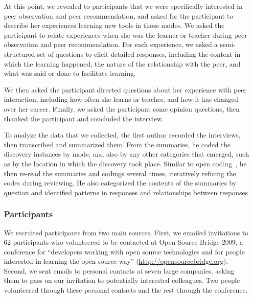 \documentclass[smallextended]{svjour3}
\newcommand\discovery{peer interaction\xspace}
\newcommand\discpush{peer recommendation\xspace}
\newcommand\discpull{peer observation\xspace}
\newcommand\contexts{modes\xspace}
\begin{document}
At this point, we revealed to participants that we were specifically interested in
\discpull and \discpush, and asked for the participant to describe her experiences learning
new tools in those \contexts.
We asked the participant to relate experiences when she was the learner or teacher
during \discpull and \discpush. 
For each experience, we asked a semi-structured set of questions to elicit
detailed responses, including the context in which the learning
happened, the nature of the relationship with the peer, and what was said or
done to facilitate learning.

We then asked the participant directed questions about her experience
with \discovery, including how often she learns or teaches, and how it
has changed over her career. 
Finally, we asked the participant some opinion questions, then thanked the
participant and concluded the interview.

To analyze the data that we collected, the first author recorded the interviews, 
then transcribed and summarized them.
From the summaries, he coded the discovery instances by mode, and also by any
other categories that emerged, such as by the location in which the discovery
took place.
Similar to open coding~\citep{glaser2009discovery}, he then re-read the summaries and codings several times, 
iteratively refining the codes during reviewing.
He also categorized the contents of the summaries by question and identified
patterns in responses and relationships between responses.

\subsubsection{Participants}

\noindent
We recruited participants from two main sources.
First, we emailed invitations to 62 participants who volunteered to be
contacted at Open Source Bridge 2009, a
conference for ``developers working with open source technologies and 
for people interested in learning the open source way''
(\url{http://opensourcebridge.org}). 
Second, we sent emails to personal contacts at seven large companies, asking
them to pass on our invitation to potentially interested colleagues.
Two people volunteered through these personal contacts and the
rest through the conference.
\end{document}
